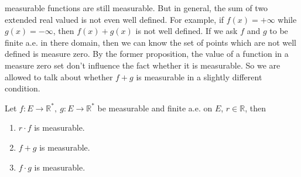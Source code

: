 \documentclass[lang=en, 12pt]{elegantbook}
\newcommand{\RR}{\mathbb{R}}
\begin{document}
        measurable functions are still measurable. But in general, the sum of two extended real valued is not even well defined. For example,
        if $f(x) = +\infty$ while $g(x) = -\infty$, then $f(x) + g(x)$ is not well defined. If we ask $f$ and $g$ to be finite a.e. in there 
        domain, then we can know the set of points which are not well defined is measure zero. By the former proposition, the value of a 
        function in a measure zero set don't influence the fact whether it is measurable. So we are allowed to talk about whether $f + g$ is 
        measurable in a slightly different condition.
            \begin{theorem}
                Let $f:E \to \RR^*, \ g: E \to \RR^*$ be measurable and finite a.e. on $E$, $r \in \RR$, then 
                \begin{enumerate}
                    \item $r \cdot f$ is measurable.
                    \item $f+g$ is measurable.
                    \item $f \cdot g$ is measurable.
                \end{enumerate}  
            \end{theorem}
\end{document}
